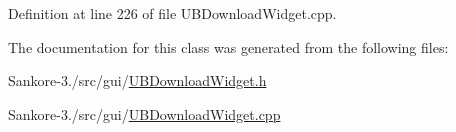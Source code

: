 Definition at line 226 of file U\-B\-Download\-Widget.\-cpp.



The documentation for this class was generated from the following files\-:\begin{DoxyCompactItemize}
\item 
Sankore-\/3./src/gui/\hyperlink{_u_b_download_widget_8h}{U\-B\-Download\-Widget.\-h}\item 
Sankore-\/3./src/gui/\hyperlink{_u_b_download_widget_8cpp}{U\-B\-Download\-Widget.\-cpp}\end{DoxyCompactItemize}
